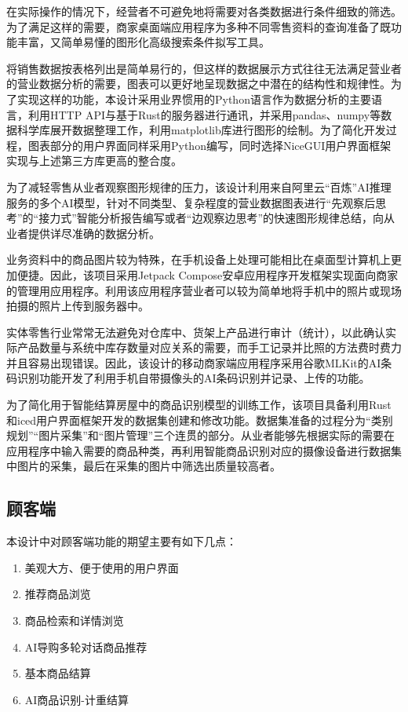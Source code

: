 在实际操作的情况下，经营者不可避免地将需要对各类数据进行条件细致的筛选。为了满足这样的需要，商家桌面端应用程序为多种不同零售资料的查询准备了既功能丰富，又简单易懂的图形化高级搜索条件拟写工具。

将销售数据按表格列出是简单易行的，但这样的数据展示方式往往无法满足营业者的营业数据分析的需要，图表可以更好地呈现数据之中潜在的结构性和规律性。为了实现这样的功能，本设计采用业界惯用的Python语言作为数据分析的主要语言，利用HTTP API与基于Rust的服务器进行通讯，并采用pandas、numpy等数据科学库展开数据整理工作，利用matplotlib库进行图形的绘制。为了简化开发过程，图表部分的用户界面同样采用Python编写，同时选择NiceGUI用户界面框架实现与上述第三方库更高的整合度。

为了减轻零售从业者观察图形规律的压力，该设计利用来自阿里云“百炼”AI推理服务的多个AI模型，针对不同类型、复杂程度的营业数据图表进行“先观察后思考”的“接力式”智能分析报告编写或者“边观察边思考”的快速图形规律总结，向从业者提供详尽准确的数据分析。

业务资料中的商品图片较为特殊，在手机设备上处理可能相比在桌面型计算机上更加便捷。因此，该项目采用Jetpack Compose安卓应用程序开发框架实现面向商家的管理用应用程序。利用该应用程序营业者可以较为简单地将手机中的照片或现场拍摄的照片上传到服务器中。

实体零售行业常常无法避免对仓库中、货架上产品进行审计（统计），以此确认实际产品数量与系统中库存数量对应关系的需要，而手工记录并比照的方法费时费力并且容易出现错误。因此，该设计的移动商家端应用程序采用谷歌MLKit的AI条码识别功能开发了利用手机自带摄像头的AI条码识别并记录、上传的功能。

为了简化用于智能结算房屋中的商品识别模型的训练工作，该项目具备利用Rust和iced用户界面框架开发的数据集创建和修改功能。数据集准备的过程分为“类别规划”“图片采集”和“图片管理”三个连贯的部分。从业者能够先根据实际的需要在应用程序中输入需要的商品种类，再利用智能商品识别对应的摄像设备进行数据集中图片的采集，最后在采集的图片中筛选出质量较高者。

\subsection{顾客端}

本设计中对顾客端功能的期望主要有如下几点：

\begin{enumerate}
    \item 美观大方、便于使用的用户界面
    \item 推荐商品浏览
    \item 商品检索和详情浏览
    \item AI导购多轮对话商品推荐
    \item 基本商品结算
    \item AI商品识别-计重结算
\end{enumerate}


